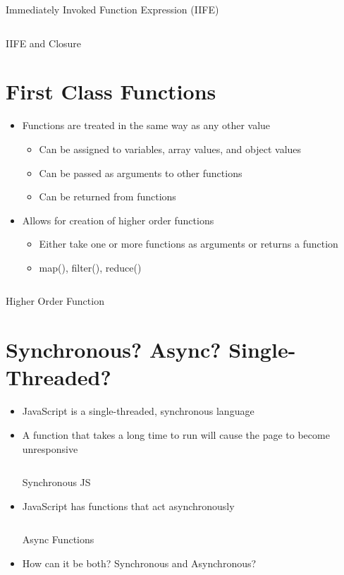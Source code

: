 \begin{code}
	\inputminted{js}{src1/2-iife.js}
	\caption{Immediately Invoked Function Expression (IIFE)}
\end{code}

\begin{code}
	\inputminted{js}{src1/3-iifeClosure.js}
	\caption{IIFE and Closure}
\end{code}

\section{First Class Functions}
\begin{itemize}
	\item Functions are treated in the same way as any other value
	      \begin{itemize}
		      \item Can be assigned to variables, array values, and object values
		      \item Can be passed as arguments to other functions
		      \item Can be returned from functions
	      \end{itemize}
	\item Allows for creation of higher order functions
	      \begin{itemize}
		      \item Either take one or more functions as arguments or returns a function
		      \item map(), filter(), reduce()
	      \end{itemize}
\end{itemize}

\begin{code}
	\inputminted{js}{src1/4-hof.js}
	\caption{Higher Order Function}
\end{code}

\clearpage
\section{Synchronous? Async? Single-Threaded?}
\begin{itemize}
	\item JavaScript is a single-threaded, synchronous language
	\item A function that takes a long time to run will cause the page to become
	      unresponsive
	      \begin{code}
		      \inputminted{js}{src1/5-hang.js}
		      \caption{Synchronous JS}
	      \end{code}
	\item JavaScript has functions that act asynchronously
	      \begin{code}
		      \inputminted{js}{src1/8-async.js}
		      \caption{Async Functions}
	      \end{code}
	\item How can it be both? Synchronous and Asynchronous?
\end{itemize}

